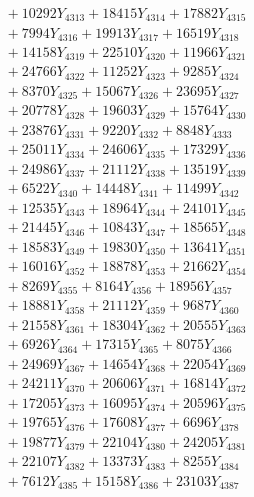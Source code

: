 \documentclass[a4paper,10pt]{article}
\begin{document}
{\begin{align}
&\;  + 10292 Y_{4313} + 18415 Y_{4314} + 17882 Y_{4315} \\[0.3ex]
&\;  + 7994 Y_{4316} + 19913 Y_{4317} + 16519 Y_{4318} \\[0.5ex]\allowbreak
&\;  + 14158 Y_{4319} + 22510 Y_{4320} + 11966 Y_{4321} \\[0.3ex]
&\;  + 24766 Y_{4322} + 11252 Y_{4323} + 9285 Y_{4324} \\[0.3ex]
&\;  + 8370 Y_{4325} + 15067 Y_{4326} + 23695 Y_{4327} \\[0.3ex]
&\;  + 20778 Y_{4328} + 19603 Y_{4329} + 15764 Y_{4330} \\[0.3ex]
&\;  + 23876 Y_{4331} + 9220 Y_{4332} + 8848 Y_{4333} \\[0.3ex]
&\;  + 25011 Y_{4334} + 24606 Y_{4335} + 17329 Y_{4336} \\[0.3ex]
&\;  + 24986 Y_{4337} + 21112 Y_{4338} + 13519 Y_{4339} \\[0.3ex]
&\;  + 6522 Y_{4340} + 14448 Y_{4341} + 11499 Y_{4342} \\[0.3ex]
&\;  + 12535 Y_{4343} + 18964 Y_{4344} + 24101 Y_{4345} \\[0.3ex]
&\;  + 21445 Y_{4346} + 10843 Y_{4347} + 18565 Y_{4348} \\[0.5ex]\allowbreak
&\;  + 18583 Y_{4349} + 19830 Y_{4350} + 13641 Y_{4351} \\[0.3ex]
&\;  + 16016 Y_{4352} + 18878 Y_{4353} + 21662 Y_{4354} \\[0.3ex]
&\;  + 8269 Y_{4355} + 8164 Y_{4356} + 18956 Y_{4357} \\[0.3ex]
&\;  + 18881 Y_{4358} + 21112 Y_{4359} + 9687 Y_{4360} \\[0.3ex]
&\;  + 21558 Y_{4361} + 18304 Y_{4362} + 20555 Y_{4363} \\[0.3ex]
&\;  + 6926 Y_{4364} + 17315 Y_{4365} + 8075 Y_{4366} \\[0.3ex]
&\;  + 24969 Y_{4367} + 14654 Y_{4368} + 22054 Y_{4369} \\[0.3ex]
&\;  + 24211 Y_{4370} + 20606 Y_{4371} + 16814 Y_{4372} \\[0.3ex]
&\;  + 17205 Y_{4373} + 16095 Y_{4374} + 20596 Y_{4375} \\[0.3ex]
&\;  + 19765 Y_{4376} + 17608 Y_{4377} + 6696 Y_{4378} \\[0.5ex]\allowbreak
&\;  + 19877 Y_{4379} + 22104 Y_{4380} + 24205 Y_{4381} \\[0.3ex]
&\;  + 22107 Y_{4382} + 13373 Y_{4383} + 8255 Y_{4384} \\[0.3ex]
&\;  + 7612 Y_{4385} + 15158 Y_{4386} + 23103 Y_{4387} \\[0.3ex]

\end{align}}
\end{document}
